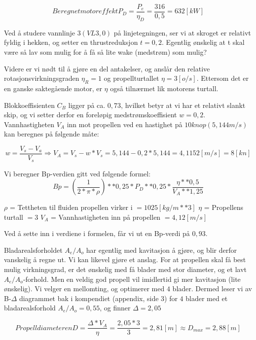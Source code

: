 \documentclass[norsk]{article}
\begin{document}
\begin{equation}
Beregnet motoreffekt P_D = \frac{P_e}{\eta_D} = \frac{316}{0,5}= 632 [kW]
\end{equation}


Ved å studere vannlinje $3 (VL 3,0)$ på linjetegningen, ser vi at skroget er relativt fyldig i hekken, og setter en thrustreduksjon $t = 0,2$. Egentlig ønskelig at t skal være så lav som mulig for å få så lite wake (medstrøm) som mulig?

Videre er vi nødt til å gjøre en del antakelser, og anslår den relative rotasjonsvirkningsgraden $\eta_R = 1$ og propellturtallet $\eta = 3 [o/s]$. Ettersom det er en ganske saktegående motor, er $\eta$ også tilnærmet lik motorens turtall. 

Blokkoeffisienten $C_B$ ligger på ca. $0,73$, hvilket betyr at vi har et relativt slankt skip, og vi setter derfor en foreløpig medstrømskoeffisient $w = 0,2$. Vannhastigheten $V_A$ inn mot propellen ved en hastighet på $10 knop (5,144m/s)$ kan beregnes på følgende måte:

\begin{equation}
w = \frac{V_s-V_a}{V_s}\Rightarrow V_A = V_s - w*V_s = 5,144 - 0,2*5,144 = 4,1152 [m/s] = 8 [kn]
\end{equation}


Vi beregner Bp-verdien gitt ved følgende formel: 
\begin{equation}
Bp = (\frac{1}{2*\pi*\rho})**0,25 * P_D** 0,25 * \frac{\eta**0,5}{V_A**1,25} 
\end{equation}

$\rho$ = Tettheten til fluiden propellen virker i $= 1025 [kg/m**3]$
$\eta$ = Propellens turtall $= 3$
$V_A$ = Vannhastigheten inn på propellen $= 4,12 [m/s]$
 
Ved å sette inn i verdiene i formelen, får vi ut en Bp-verdi på $0,93$. 

Bladarealsforholdet $A_e/A_o$ har egentlig med kavitasjon å gjøre, og blir derfor vanskelig å regne ut. Vi kan likevel gjøre et anslag. For at propellen skal få best mulig virkningsgrad, er det ønskelig med få blader med stor diameter, og et lavt $A_e/A_o$-forhold. Men en veldig god propell vil imidlertid gi mer kavitasjon (lite ønskelig). Vi velger en mellomting, og optimerer med $4$ blader. Dermed leser vi av B-$\Delta$ diagrammet bak i kompendiet (appendix, side $3$) for $4$ blader med et bladarealsforhold $A_e/A_o = 0,55$, og finner $\Delta= 2,05$ 

\begin{equation}
Propelldiameteren D = \frac{{\Delta}*V_A}{\eta} = \frac{2,05*3}{3}= 2,81 [m]
\approx D_{max} = 2,88[m] 
\end{equation}
\end{document}
